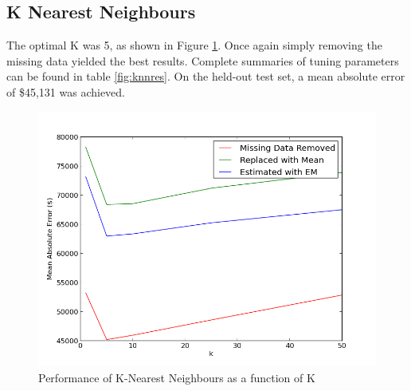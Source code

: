 \documentclass{acm_proc_article-sp}
\begin{document}
\subsection{K Nearest Neighbours}
	The optimal K was 5, as shown in Figure \ref{fig:knn}. Once again simply removing the missing data yielded the best results. Complete summaries of tuning parameters can be found in table \ref{fig:knnres}. On the held-out test set, a mean absolute error of \$45,131 was achieved.
	
	\begin{figure}[!htbp]
   		\centering
  		\includegraphics[width=\linewidth]{knn_tuning.png}
    		\caption{Performance of K-Nearest Neighbours as a function of K}
    		\label{fig:knn}
	\end{figure}
\end{document}
